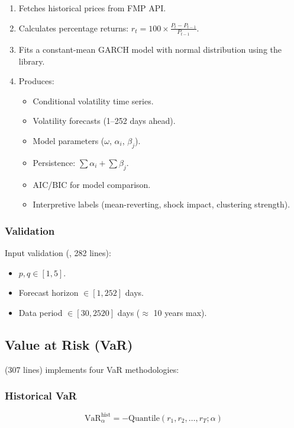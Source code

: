 \begin{enumerate}
  \item Fetches historical prices from FMP API.
  \item Calculates percentage returns: $r_t = 100 \times \frac{P_t - P_{t-1}}{P_{t-1}}$.
  \item Fits a constant-mean GARCH model with normal distribution using the  library.
  \item Produces:
  \begin{itemize}
    \item Conditional volatility time series.
    \item Volatility forecasts (1--252 days ahead).
    \item Model parameters ($\omega$, $\alpha_i$, $\beta_j$).
    \item Persistence: $\sum \alpha_i + \sum \beta_j$.
    \item AIC/BIC for model comparison.
    \item Interpretive labels (mean-reverting, shock impact, clustering strength).
  \end{itemize}
\end{enumerate}

\subsubsection{Validation}

Input validation (, 282 lines):
\begin{itemize}
  \item $p, q \in [1, 5]$.
  \item Forecast horizon $\in [1, 252]$ days.
  \item Data period $\in [30, 2520]$ days ($\approx$ 10 years max).
\end{itemize}

\subsection{Value at Risk (VaR)}

 (307 lines) implements four VaR methodologies:

\subsubsection{Historical VaR}

\begin{equation}
\text{VaR}_\alpha^{\text{hist}} = -\text{Quantile}(r_1, r_2, \ldots, r_T; \alpha)
\end{equation}

